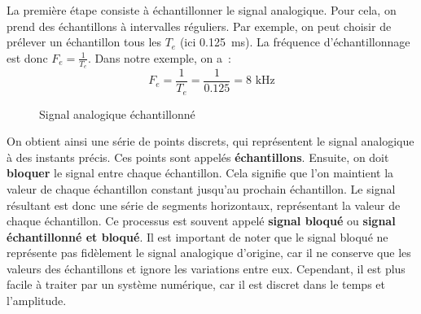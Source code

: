 La première étape consiste à échantillonner le signal analogique. Pour cela, on
prend des échantillons à intervalles réguliers. Par exemple, on peut choisir de
prélever un échantillon tous les \(T_e\) (ici \SI{0.125}{\ms}). La fréquence
d'échantillonnage est donc \(F_e=\frac{1}{T_e}\). Dans notre exemple, on a~:
\[
    F_e = \frac{1}{T_e} = \frac{1}{0.125} = 8 \text{ kHz}
\]
\begin{figure}[H]
    \centering
    \caption{Signal analogique échantillonné}
    \label{figSignalEchantillonne}
\end{figure}

On obtient ainsi une série de points discrets, qui représentent le signal
analogique à des instants précis. Ces points sont appelés \textbf{échantillons}.
Ensuite, on doit \textbf{bloquer} le signal entre chaque échantillon. Cela signifie
que l'on maintient la valeur de chaque échantillon constant jusqu'au prochain
échantillon. Le signal résultant est donc une série de segments horizontaux,
représentant la valeur de chaque échantillon. Ce processus est souvent appelé
\textbf{signal bloqué} ou \textbf{signal échantillonné et bloqué}. Il est important
de noter que le signal bloqué ne représente pas fidèlement le signal analogique
d'origine, car il ne conserve que les valeurs des échantillons et ignore les
variations entre eux. Cependant, il est plus facile à traiter par un système
numérique, car il est discret dans le temps et l'amplitude.

